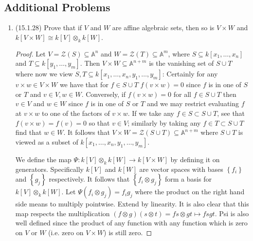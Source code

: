 \documentclass[11pt]{article}
\newcommand{\cbr}[1]{\left\{#1\right\}}
\begin{document}
\subsection*{Additional Problems}
\begin{enumerate}
    \item (15.1.28) Prove that if $V$ and $W$ are affine algebraic sets, then so is $V\times W$ and $k[V\times W]\cong k[V]\otimes_kk[W]$. \begin{proof}
        Let $V = \mathcal{Z}(S)\subseteq \mathbb{A}^n$ and $W = \mathcal{Z}(T)\subseteq \mathbb{A}^m$, where $S\subseteq k[x_1,\dots,x_n]$ and $T\subseteq k[y_1,\dots,y_m]$. Then $V\times W \subseteq \mathbb{A}^{n+m}$ is the vanishing set of $S\cup T$ where now we view $S,T\subseteq k[x_1,\dots,x_n,y_1,\dots,y_m]$: Certainly for any $v\times w\in V\times W$ we have that for $f\in S\cup T$ $f(v\times w) = 0$ since $f$ is in one of $S$ or $T$ and $v\in V, w\in W$. Conversely, if $f(v\times w) = 0$ for all $f\in S\cup T$ then $v\in V$ and $w\in W$ since $f$ is in one of $S$ or $T$ and we may restrict evaluating $f$ at $v\times w$ to one of the factors of $v\times w$. If we take any $f\in S\subset S\cup T$, see that $f(v\times w) = f(v) = 0$ so that $v\in V$; similarly by taking any $f\in T\subset S\cup T$ find that $w\in W$. It follows that $V\times W = \mathcal{Z}(S\cup T)\subseteq \mathbb{A}^{n+m}$ where $S\cup T$ is viewed as a subset of $k[x_1,\dots,x_n,y_1,\dots,y_m]$.

        We define the map $\Psi\colon k[V]\otimes_kk[W]\to k[V\times W]$ by defining it on generators. Specifically $k[V]$ and $k[W]$ are vector spaces with bases $\cbr{f_i}$ and $\cbr{g_j}$ respectively. It follows that $\cbr{f_i\otimes g_j}$ form a basis for $k[V]\otimes_kk[W]$. Let $\Psi(f_i\otimes g_j) = f_ig_j$ where the product on the right hand side means to multiply pointwise. Extend by linearity. It is also clear that this map respects the multiplication $(f\otimes g)(s\otimes t) = fs\otimes gt\mapsto fsgt$. Psi is also well defined since the product of any function with any function which is zero on $V$ or $W$ (i.e. zero on $V\times W$) is still zero.


\end{proof}
\end{enumerate}
\end{document}
